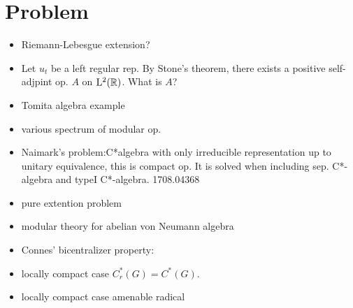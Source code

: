 \section{Problem}
\begin{itemize}
  \item Riemann-Lebesgue extension?
  \item Let $u_t$ be a left regular rep. By Stone's theorem, there exists a positive self-adjpint op. $A$ on ${\rm L}^2(\mathbb{R})$. What is $A$?
  \item Tomita algebra example
  \item various spectrum of modular op.
  \item Naimark's problem:C*algebra with only irreducible representation up to unitary equivalence, this is compact op. It is solved when including sep. C*-algebra and typeI C*-algebra. 1708.04368
  \item pure extention problem
  \item modular theory for abelian von Neumann algebra
  \item Connes' bicentralizer property:
  \item locally compact case $C_r^*(G) = C^*(G)$.
  \item locally compact case amenable radical
    
    
    
  
\end{itemize}
